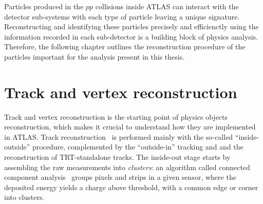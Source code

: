 \large
Particles produced in the $pp$ collisions inside ATLAS can 
interact with the detector sub-systems
with each type of particle leaving a unique signature.
Reconstructing and identifying these particles precisely and efficienctly 
using the information recorded in each sub-detector is a 
building block of physics analysis.
Therefore, the following chapter outlines the reconstruction procedure of 
the particles important for the analysis present in this thesis.
\section{Track and vertex reconstruction}
\label{sec:track}
Track and vertex reconstruction is the starting point 
of physics objects reconstruction, 
which makes it crucial to understand how they are implemented in ATLAS.
Track reconstruction~\cite{ATLAS-CONF-2012-042,PERF-2015-08} is performed 
mainly with the so-called ``inside-outside'' procedure, 
complemented by the ``outside-in'' tracking and 
and the reconstruction of TRT-standalone tracks. 
The inside-out stage starts by assembling the raw measurements
into \textit{clusters}:
an algorithm called connected component analysis~\cite{CCA} 
groups pixels and strips in a given sensor, 
where the deposited energy yields a charge above threshold, 
with a common edge or corner into clusters. 
    
